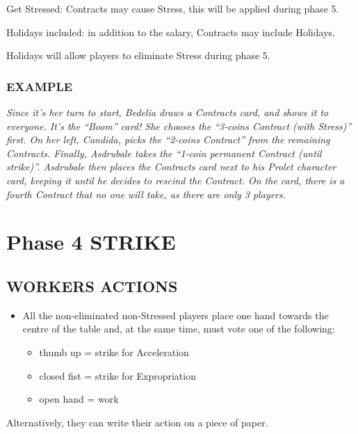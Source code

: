             Get Stressed: Contracts may cause Stress, this will be applied during
            phase 5.

            Holidays included: in addition to the salary, Contracts may include Holidays.

            Holidays will allow players to eliminate Stress during phase 5.

        \subsubsection{EXAMPLE}

            \textit{Since it's her turn to start, Bedelia draws a Contracts card, and shows it to everyone. It's the
            “Boom” card! She chooses the “3-coins Contract (with Stress)” first. On her left, Candida,
            picks the “2-coins Contract” from the remaining Contracts. Finally, Asdrubale takes the “1-coin
            permanent Contract (until strike)”. Asdrubale then places the Contracts card next to his
            Prolet character card, keeping it until he decides to rescind the Contract. On the card, there
            is a fourth Contract that no one will take, as there are only 3 players.}



\section{Phase 4 STRIKE}

    \subsection{WORKERS ACTIONS}

        \begin{itemize}
            \item All the non-eliminated non-Stressed players place one hand towards the
            centre of the table and, at the same time, must vote one of the following:
            \begin{itemize}
                \item thumb up = strike for Acceleration
                \item closed fist = strike for Expropriation
                \item open hand = work
            \end{itemize}
        \end{itemize}
Alternatively, they can write their action on a piece of paper.

